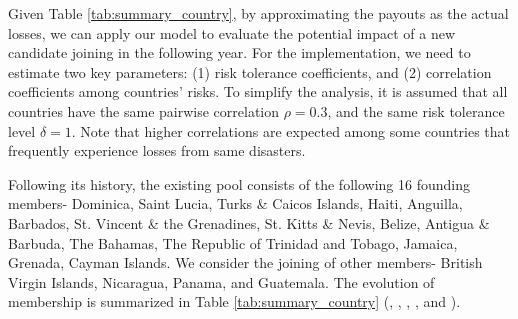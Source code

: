 \documentclass[fleqn,mnsc,nonblindrev]{informs4}
\begin{document}
Given Table \ref{tab:summary_country}, by approximating the payouts as the actual losses, we can apply our model to evaluate the potential impact of a new candidate joining in the following year. For the implementation, we need to estimate two key parameters: (1) risk tolerance coefficients, and (2) correlation coefficients among countries' risks. To simplify the analysis, it is assumed that all countries have the same pairwise correlation $\rho=0.3$, and the same risk tolerance level $\delta=1$. Note that higher correlations are expected among some countries that frequently experience losses from same disasters.

Following its history, the existing pool consists of the following 16 founding members- Dominica, Saint Lucia, Turks \& Caicos Islands, Haiti, Anguilla, Barbados, St. Vincent \& the Grenadines, St. Kitts \& Nevis, Belize, Antigua \& Barbuda, The Bahamas, The Republic of Trinidad and Tobago, Jamaica, Grenada, Cayman Islands. We consider the joining of other members- British Virgin Islands, Nicaragua, Panama, and Guatemala. The evolution of membership is summarized in Table \ref{tab:summary_country} (\cite{ccrif_members}, \cite{caricom_ccrif}, \cite{worldbank_ccrif}, \cite{ccrif_carec_webinar}, and \cite{ccrif_honduras}).
\end{document}
